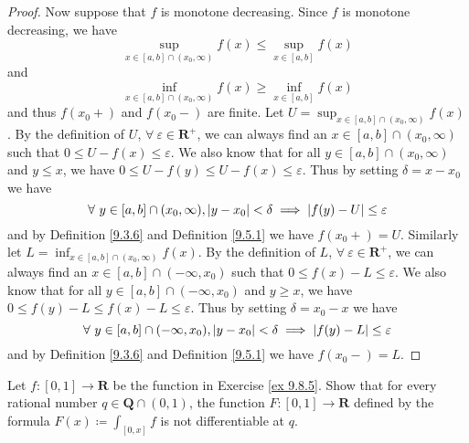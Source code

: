 \begin{proof}
    Now suppose that \(f\) is monotone decreasing.
    Since \(f\) is monotone decreasing, we have
    \[
        \sup_{x \in [a, b] \cap (x_0, \infty)} f(x) \leq \sup_{x \in [a, b]} f(x)
    \]
    and
    \[
        \inf_{x \in [a, b] \cap (x_0, \infty)} f(x) \geq \inf_{x \in [a, b]} f(x)
    \]
    and thus \(f(x_0+)\) and \(f(x_0-)\) are finite.
    Let \(U = \sup_{x \in [a, b] \cap (x_0, \infty)} f(x)\).
    By the definition of \(U\), \(\forall\ \varepsilon \in \mathbf{R}^+\), we can always find an \(x \in [a, b] \cap (x_0, \infty)\) such that \(0 \leq U - f(x) \leq \varepsilon\).
    We also know that for all \(y \in [a, b] \cap (x_0, \infty)\) and \(y \leq x\), we have \(0 \leq U - f(y) \leq U - f(x) \leq \varepsilon\).
    Thus by setting \(\delta = x - x_0\) we have
    \[
        \forall\ y \in [a, b] \cap (x_0, \infty), \abs*{y - x_0} < \delta \implies \abs*{f(y) - U} \leq \varepsilon
    \]
    and by Definition \ref{9.3.6} and Definition \ref{9.5.1} we have \(f(x_0+) = U\).
    Similarly let \(L = \inf_{x \in [a, b] \cap (x_0, \infty)} f(x)\).
    By the definition of \(L\), \(\forall\ \varepsilon \in \mathbf{R}^+\), we can always find an \(x \in [a, b] \cap (-\infty, x_0)\) such that \(0 \leq f(x) - L \leq \varepsilon\).
    We also know that for all \(y \in [a, b] \cap (-\infty, x_0)\) and \(y \geq x\), we have \(0 \leq f(y) - L \leq f(x) - L \leq \varepsilon\).
    Thus by setting \(\delta = x_0 - x\) we have
    \[
        \forall\ y \in [a, b] \cap (-\infty, x_0), \abs*{y - x_0} < \delta \implies \abs*{f(y) - L} \leq \varepsilon
    \]
    and by Definition \ref{9.3.6} and Definition \ref{9.5.1} we have \(f(x_0-) = L\).
\end{proof}

\exercisesection

\begin{exercise}\label{ex 11.9.1}
    Let \(f : [0, 1] \to \mathbf{R}\) be the function in Exercise \ref{ex 9.8.5}.
    Show that for every rational number \(q \in \mathbf{Q} \cap (0, 1)\), the function \(F : [0, 1] \to \mathbf{R}\) defined by the formula \(F(x) \coloneqq \int_{[0, x]} f\) is not differentiable at \(q\).
\end{exercise}

